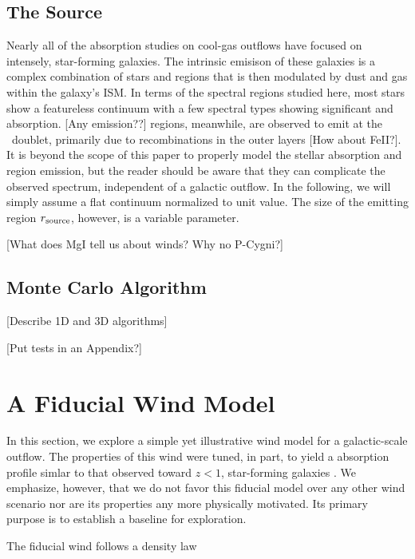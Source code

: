 \documentclass[12pt,preprint]{aastex}
\begin{document}
{\subsection{The Source}

Nearly all of the absorption studies on cool-gas outflows 
have focused on intensely, star-forming galaxies.  The
intrinsic emisison of these galaxies is a complex combination of
stars and  regions that is then modulated by dust and gas
within the galaxy's ISM.  In terms of the spectral regions studied
here, most stars show a featureless continuum with a few spectral
types showing significant  and  absorption.
[Any emission??]   regions, meanwhile, are observed to emit
at the \mgiid\ doublet, primarily due to recombinations in the outer
layers [How about FeII?].  It is beyond the scope of this paper to
properly model the 
stellar absorption and  region emission, but the reader
should be aware that they can complicate the observed spectrum,
independent of a galactic outflow.
In the following, we will simply assume a flat continuum 
normalized to unit value.  The size of the emitting
region $r_{\rm source}$, however, is a variable parameter.

[What does MgI tell us about winds?  Why no P-Cygni?]

\subsection{Monte Carlo Algorithm}

[Describe 1D and 3D algorithms]

[Put tests in an Appendix?]

\section{A Fiducial Wind Model}
\label{sec:fiducial}

In this section, we explore a simple yet illustrative wind model for
a galactic-scale outflow.  The properties of this wind were tuned, in
part, to yield a  absorption profile 
simlar to that observed toward $z<1$, star-forming galaxies
\citep{wcp+09,rubin10b}.  We emphasize, however, that we do not
favor this fiducial model over any other wind scenario nor are its
properties any more physically motivated. 
Its primary purpose is to establish a baseline for exploration.

The fiducial wind follows a density law

}
\end{document}
